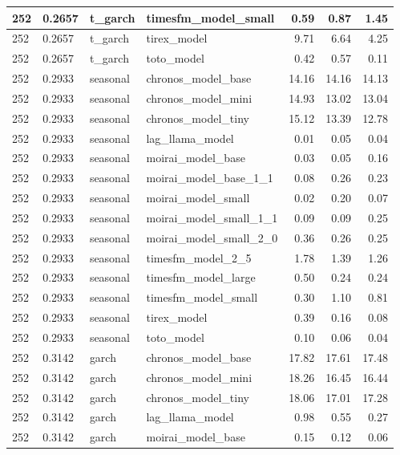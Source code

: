 {\begin{tabular}{llllrrr}
\midrule
252 & 0.2657 & t\_garch & timesfm\_model\_small & 0.59 & 0.87 & 1.45 \\
\midrule
252 & 0.2657 & t\_garch & tirex\_model & 9.71 & 6.64 & 4.25 \\
\midrule
252 & 0.2657 & t\_garch & toto\_model & 0.42 & 0.57 & 0.11 \\
\midrule
252 & 0.2933 & seasonal & chronos\_model\_base & 14.16 & 14.16 & 14.13 \\
\midrule
252 & 0.2933 & seasonal & chronos\_model\_mini & 14.93 & 13.02 & 13.04 \\
\midrule
252 & 0.2933 & seasonal & chronos\_model\_tiny & 15.12 & 13.39 & 12.78 \\
\midrule
252 & 0.2933 & seasonal & lag\_llama\_model & 0.01 & 0.05 & 0.04 \\
\midrule
252 & 0.2933 & seasonal & moirai\_model\_base & 0.03 & 0.05 & 0.16 \\
\midrule
252 & 0.2933 & seasonal & moirai\_model\_base\_1\_1 & 0.08 & 0.26 & 0.23 \\
\midrule
252 & 0.2933 & seasonal & moirai\_model\_small & 0.02 & 0.20 & 0.07 \\
\midrule
252 & 0.2933 & seasonal & moirai\_model\_small\_1\_1 & 0.09 & 0.09 & 0.25 \\
\midrule
252 & 0.2933 & seasonal & moirai\_model\_small\_2\_0 & 0.36 & 0.26 & 0.25 \\
\midrule
252 & 0.2933 & seasonal & timesfm\_model\_2\_5 & 1.78 & 1.39 & 1.26 \\
\midrule
252 & 0.2933 & seasonal & timesfm\_model\_large & 0.50 & 0.24 & 0.24 \\
\midrule
252 & 0.2933 & seasonal & timesfm\_model\_small & 0.30 & 1.10 & 0.81 \\
\midrule
252 & 0.2933 & seasonal & tirex\_model & 0.39 & 0.16 & 0.08 \\
\midrule
252 & 0.2933 & seasonal & toto\_model & 0.10 & 0.06 & 0.04 \\
\midrule
252 & 0.3142 & garch & chronos\_model\_base & 17.82 & 17.61 & 17.48 \\
\midrule
252 & 0.3142 & garch & chronos\_model\_mini & 18.26 & 16.45 & 16.44 \\
\midrule
252 & 0.3142 & garch & chronos\_model\_tiny & 18.06 & 17.01 & 17.28 \\
\midrule
252 & 0.3142 & garch & lag\_llama\_model & 0.98 & 0.55 & 0.27 \\
\midrule
252 & 0.3142 & garch & moirai\_model\_base & 0.15 & 0.12 & 0.06 \\

\end{tabular}}
